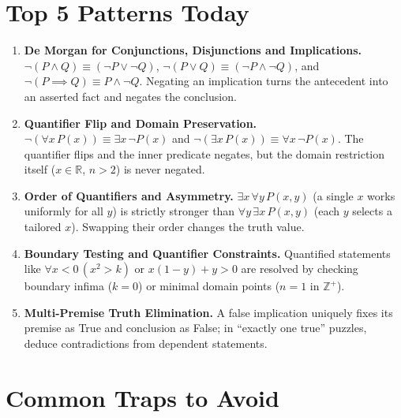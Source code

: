 \documentclass[11pt,a4paper]{article}
\begin{document}
\section*{Top 5 Patterns Today}

\begin{enumerate}[leftmargin=2em, itemsep=4pt]
  \item \textbf{De Morgan for Conjunctions, Disjunctions and Implications.}
        $\neg(P\land Q)\equiv(\neg P\lor\neg Q)$, $\neg(P\lor Q)\equiv(\neg P\land\neg Q)$, and $\neg(P\implies Q)\equiv P\land\neg Q$. Negating an implication turns the antecedent into an asserted fact and negates the conclusion. 
  \item \textbf{Quantifier Flip and Domain Preservation.}
        $\neg(\forall x\,P(x))\equiv\exists x\,\neg P(x)$ and $\neg(\exists x\,P(x))\equiv\forall x\,\neg P(x)$. The quantifier flips and the inner predicate negates, but the domain restriction itself ($x \in \mathbb{R}$, $n > 2$) is never negated. 
  \item \textbf{Order of Quantifiers and Asymmetry.}
        $\exists x\,\forall y\,P(x,y)$ (a single $x$ works uniformly for all $y$) is strictly stronger than $\forall y\,\exists x\,P(x,y)$ (each $y$ selects a tailored $x$). Swapping their order changes the truth value. 
  \item \textbf{Boundary Testing and Quantifier Constraints.}
        Quantified statements like $\forall x < 0\,(x^2 > k)$ or $x(1-y)+y > 0$ are resolved by checking boundary infima ($k=0$) or minimal domain points ($n=1$ in $\mathbb{Z}^+$). 
  \item \textbf{Multi-Premise Truth Elimination.}
        A false implication uniquely fixes its premise as True and conclusion as False; in ``exactly one true'' puzzles, deduce contradictions from dependent statements. 
\end{enumerate}

\section*{Common Traps to Avoid}
\end{document}
